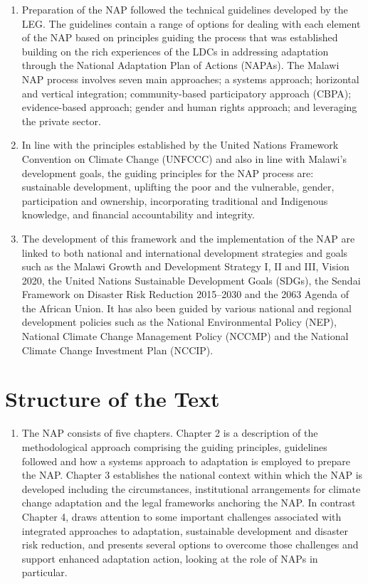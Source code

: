 \documentclass[
]{book}
\providecommand{\tightlist}{%
  \setlength{\itemsep}{0pt}\setlength{\parskip}{0pt}}
\begin{document}
\begin{enumerate}
\def\labelenumi{\arabic{enumi}.}
\setcounter{enumi}{8}
\item
  Preparation of the NAP followed the technical guidelines developed by the LEG. The guidelines contain a range of options for dealing with each element of the NAP based on principles guiding the process that was established building on the rich experiences of the LDCs in addressing adaptation through the National Adaptation Plan of Actions (NAPAs). The Malawi NAP process involves seven main approaches; a systems approach; horizontal and vertical integration; community-based participatory approach (CBPA); evidence-based approach; gender and human rights approach; and leveraging the private sector.
\item
  In line with the principles established by the United Nations Framework Convention on Climate Change (UNFCCC) and also in line with Malawi's development goals, the guiding principles for the NAP process are: sustainable development, uplifting the poor and the vulnerable, gender, participation and ownership, incorporating traditional and Indigenous knowledge, and financial accountability and integrity.
\item
  The development of this framework and the implementation of the NAP are linked to both national and international development strategies and goals such as the Malawi Growth and Development Strategy I, II and III, Vision 2020, the United Nations Sustainable Development Goals (SDGs), the Sendai Framework on Disaster Risk Reduction 2015--2030 and the 2063 Agenda of the African Union. It has also been guided by various national and regional development policies such as the National Environmental Policy (NEP), National Climate Change Management Policy (NCCMP) and the National Climate Change Investment Plan (NCCIP).
\end{enumerate}

\hypertarget{structure-of-the-text}{%
\section{Structure of the Text}\label{structure-of-the-text}}

\begin{enumerate}
\def\labelenumi{\arabic{enumi}.}
\setcounter{enumi}{11}
\tightlist
\item
  The NAP consists of five chapters. Chapter 2 is a description of the methodological approach comprising the guiding principles, guidelines followed and how a systems approach to adaptation is employed to prepare the NAP. Chapter 3 establishes the national context within which the NAP is developed including the circumstances, institutional arrangements for climate change adaptation and the legal frameworks anchoring the NAP. In contrast Chapter 4, draws attention to some important challenges associated with integrated approaches to adaptation, sustainable development and disaster risk reduction, and presents several options to overcome those challenges and support enhanced adaptation action, looking at the role of NAPs in particular.
\end{enumerate}
\end{document}
